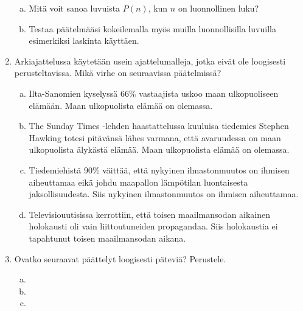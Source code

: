 \begin{enumerate}
\begin{enumerate}[a)]
            \item Mitä voit sanoa luvuista $P(n)$, kun $n$ on luonnollinen luku?
            \item Testaa päätelmääsi kokeilemalla myös muilla luonnollisilla luvuilla esimerkiksi laskinta käyttäen.
        \end{enumerate}
    \item Arkiajattelussa käytetään usein ajattelumalleja, jotka eivät ole loogisesti perusteltavissa.
        Mikä virhe on seuraavissa päätelmissä?
        \begin{enumerate}[a)]
            \item Ilta-Sanomien kyselyssä $66\%$ vastaajista uskoo maan ulkopuoliseen elämään.
                Maan ulkopuolista elämää on olemassa.
            \item The Sunday Times -lehden haastattelussa kuuluisa tiedemies Stephen Hawking
                totesi pitävänsä lähes varmana, että avaruudessa on maan ulkopuolista älykästä elämää.
                Maan ulkopuolista elämää on olemassa.
            \item Tiedemiehistä 90\% väittää, että nykyinen ilmastonmuutos on ihmisen aiheuttamaa
                eikä johdu maapallon lämpötilan luontaisesta jaksollisuudesta.
                Siis nykyinen ilmastonmuutos on ihmisen aiheuttamaa.
            \item Televisiouutisissa kerrottiin, että toisen maailmansodan aikainen holokausti oli
                vain liittoutuneiden propagandaa.
                Siis holokaustia ei tapahtunut toisen maailmansodan aikana.
        \end{enumerate}
    \item Ovatko seuraavat päättelyt loogisesti päteviä? Perustele.
        \begin{enumerate}[a)]
            \item {}
            \item {}
            \item {}
        \end{enumerate}
\end{enumerate}

